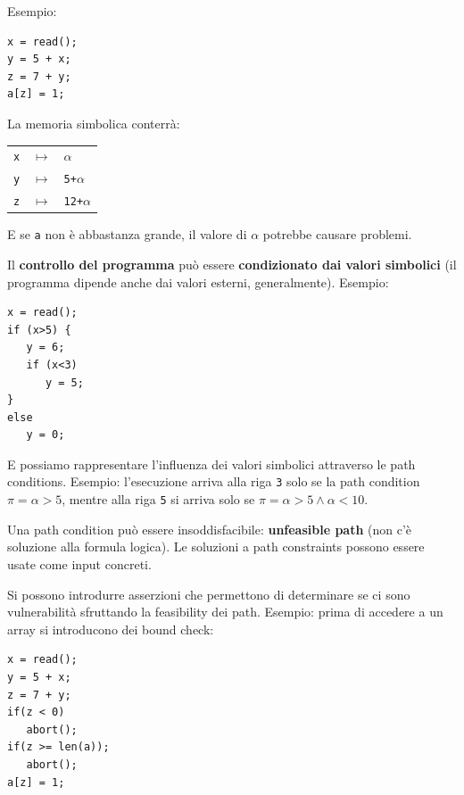 Esempio: 
\begin{center}
	\begin{minipage}{0.3\linewidth}
		\begin{verbatim}
x = read();
y = 5 + x;
z = 7 + y;
a[z] = 1;
		\end{verbatim}
	\end{minipage}
	\hfill
	\begin{minipage}{0.6\linewidth}
		La memoria simbolica conterrà: 
		\begin{center}
			\begin{tabular}{l l l}
				\texttt{x} & $\mapsto$ & $\alpha$ \\
				\texttt{y} & $\mapsto$ & \texttt{5+$\alpha$} \\
				\texttt{z} & $\mapsto$ & \texttt{12+$\alpha$}
			\end{tabular}
		\end{center}
		E se \texttt{a} non è abbastanza grande, il valore di $\alpha$ potrebbe causare problemi.
	\end{minipage}
\end{center}

Il \textbf{controllo del programma} può essere \textbf{condizionato dai valori simbolici} (il programma dipende anche dai valori esterni, generalmente). Esempio:
\begin{center}
	\begin{minipage}{0.3\linewidth}
		\begin{verbatim}
x = read();
if (x>5) {
   y = 6;
   if (x<3)
      y = 5;
} 
else 
   y = 0;
		\end{verbatim}
	\end{minipage}
\end{center}

E possiamo rappresentare l'influenza dei valori simbolici attraverso le path conditions. Esempio: l'esecuzione arriva alla riga \texttt{3} solo se la path condition $\pi = \alpha > 5$, mentre alla riga \texttt{5} si arriva solo se $\pi = \alpha > 5 \wedge \alpha < 10$.

Una path condition può essere insoddisfacibile: \textbf{unfeasible path} (non c'è soluzione alla formula logica). Le soluzioni a path constraints possono essere usate come input concreti.

Si possono introdurre asserzioni che permettono di determinare se ci sono vulnerabilità sfruttando la feasibility dei path. Esempio: prima di accedere a un array si introducono dei bound check:
\begin{center}
	\begin{minipage}{0.35\linewidth}
		\begin{verbatim}
x = read();
y = 5 + x;
z = 7 + y;
if(z < 0)
   abort();
if(z >= len(a));
   abort();
a[z] = 1;
		\end{verbatim}
	\end{minipage}
\end{center}


